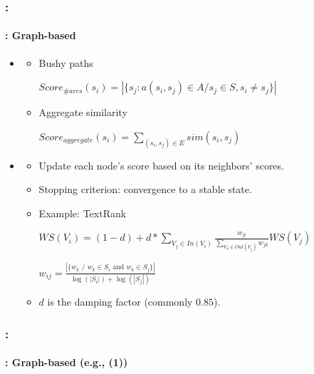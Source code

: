\documentclass[xcolor=table]{beamer}
\begin{document}
\begin{frame}
	\frametitle{\insertshortsubtitle: \insertsection}
	\framesubtitle{\insertsubsection: Graph-based}
	
	\begin{itemize}
		\item {}
		\begin{itemize}
			\item Bushy paths 
			
			\hspace{.5cm}$Score_{\#arcs}(s_i) = |\{ s_j : a(s_i, s_j) \in A / s_j \in S, s_i \neq s_j \}|$
			
			\item Aggregate similarity
			
			\hspace{.5cm}$Score_{aggregate}(s_i) = \sum\limits_{(s_i, s_j) \in E} sim(s_i, s_j)$
		\end{itemize}
		\item {}
		\begin{itemize}
			\item Update each node's score based on its neighbors' scores.
			\item Stopping criterion: convergence to a stable state.
			\item Example: TextRank \cite{04-mihalcea-tarau}
			
			$WS(V_i) = ( 1 - d) + d * \sum\limits_{V_j \in In(V_i)} \frac{w_{ji}}{\sum\limits_{V_k \in Out(V_j)} w_{jk}} WS(V_j)$
			
			$w_{ij} = \frac{|\{w_k \text{ / } w_k \in S_i \text{ and } w_k \in S_j\}|}{\log(|S_i|) + \log(|S_j|)}$
			
			\item \( d \) is the damping factor (commonly \(0.85\)).
		\end{itemize}
	\end{itemize}

\end{frame}


\begin{frame}
	\frametitle{\insertshortsubtitle: \insertsection}
	\framesubtitle{\insertsubsection: Graph-based (e.g., \cite{21-aries-al} (1))}
	
	\begin{center}
	\end{center}
	
\end{frame}
\end{document}
